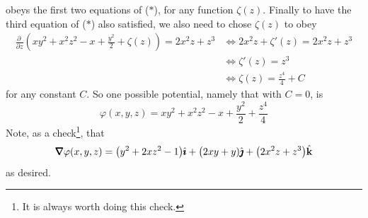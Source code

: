 \begin{eg}
\begin{equation*}
\end{equation*}
obeys the first two equations of ($*$),
for any function $\zeta(z)$. Finally to have the third equation of 
($*$) also satisfied, we also need to chose $\zeta(z)$
to obey
\begin{align*}
\frac{\partial \ }{\partial z}\left(xy^2+x^2z^2-x+\frac{y^2}{2}+\zeta(z)\right) 
 = 2x^2z+z^3 
&\iff 2x^2z +\zeta'(z) = 2x^2z + z^3 \\
&\iff \zeta'(z) = z^3\\
&\iff \zeta(z) = \frac{z^4}{4} + C
\end{align*}
for any constant $C$. So one possible potential, namely that with $C=0$, is
\begin{equation*}
\varphi(x,y,z)
=xy^2+x^2z^2-x+\frac{y^2}{2}+\frac{z^4}{4}
\end{equation*}
Note, as a check\footnote{It is always worth doing this check.}, that
\begin{equation*}
\vnabla \varphi(x,y,z)
=\big(y^2+2xz^2-1\big)\hi+\big(2xy+y)\hj+\big(2x^2z+z^3\big)\hk
\end{equation*}
as desired.
\end{eg}

